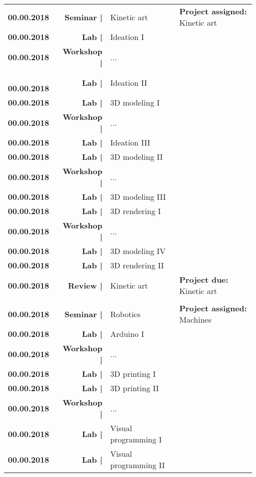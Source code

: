 \documentclass[11pt,article,oneside]{memoir}
\begin{document}
\begin{table}[H]
\small
\begin{tabular}{l r @{\hskip 0.1cm} l @{\hskip 0.5cm} l}
\textbf{00.00.2018} & \textbf{Seminar |} & Kinetic art & \textbf{Project assigned:} Kinetic art\\
\textbf{00.00.2018} & \textbf{Lab |} & Ideation I\\
\textbf{00.00.2018} & \textbf{Workshop |} & ...\\\
\textbf{00.00.2018} & \textbf{Lab |} & Ideation II\\
\textbf{00.00.2018} & \textbf{Lab |} & 3D modeling I\\
\textbf{00.00.2018} & \textbf{Workshop |} & ...\\
\textbf{00.00.2018} & \textbf{Lab |} & Ideation III\\
\textbf{00.00.2018} & \textbf{Lab |} & 3D modeling II\\
\textbf{00.00.2018} & \textbf{Workshop |} & ...\\
\textbf{00.00.2018} & \textbf{Lab |} & 3D modeling III\\
\textbf{00.00.2018} & \textbf{Lab |} & 3D rendering I\\
\textbf{00.00.2018} & \textbf{Workshop |} & ...\\
\textbf{00.00.2018} & \textbf{Lab |} & 3D modeling IV\\
\textbf{00.00.2018} & \textbf{Lab |} & 3D rendering II\\
\textbf{00.00.2018} & \textbf{Review |} & Kinetic art & \textbf{Project due:} Kinetic art\\
\\
\textbf{00.00.2018} & \textbf{Seminar |} & Robotics & \textbf{Project assigned:} Machines\\
\textbf{00.00.2018} & \textbf{Lab |} & Arduino I\\
\textbf{00.00.2018} & \textbf{Workshop |} & ... \\
\textbf{00.00.2018} & \textbf{Lab |} & 3D printing I \\
\textbf{00.00.2018} & \textbf{Lab |} & 3D printing II\\
\textbf{00.00.2018} & \textbf{Workshop |} & ...\\
\textbf{00.00.2018} & \textbf{Lab |} & Visual programming I\\ %
\textbf{00.00.2018} & \textbf{Lab |} & Visual programming II\\ %

\end{tabular}
\end{table}
\end{document}
